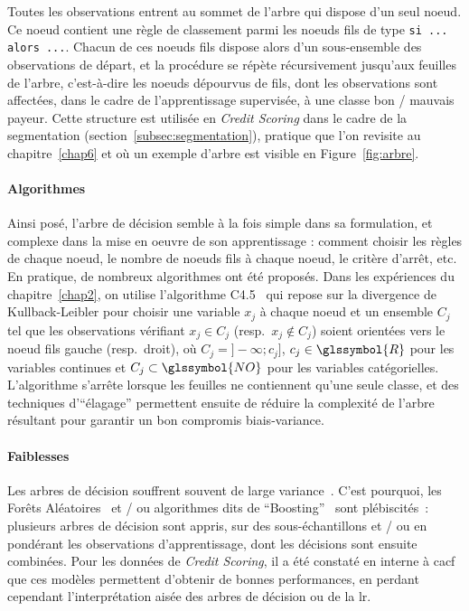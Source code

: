 Toutes les observations entrent au sommet de l'arbre qui dispose d'un seul noeud. Ce noeud contient une règle de classement parmi les noeuds fils de type \verb|si ... alors ...|. Chacun de ces noeuds fils dispose alors d'un sous-ensemble des observations de départ, et la procédure se répète récursivement jusqu'aux feuilles de l'arbre, c'est-à-dire les noeuds dépourvus de fils, dont les observations sont affectées, dans le cadre de l'apprentissage supervisée, à une classe bon / mauvais payeur. Cette structure est utilisée en \textit{Credit Scoring} dans le cadre de la segmentation (section~\ref{subsec:segmentation}), pratique que l'on revisite au chapitre~\ref{chap6} et où un exemple d'arbre est visible en Figure~\ref{fig:arbre}.

\paragraph{Algorithmes}

Ainsi posé, l'arbre de décision semble à la fois simple dans sa formulation, et complexe dans la mise en oeuvre de son apprentissage : comment choisir les règles de chaque noeud, le nombre de noeuds fils à chaque noeud, le critère d'arrêt, etc. En pratique, de nombreux algorithmes ont été proposés. Dans les expériences du chapitre~\ref{chap2}, on utilise l'algorithme C4.5~\cite{quinlan2014c4} qui repose sur la divergence de Kullback-Leibler pour choisir une variable $x_j$ à chaque noeud et un ensemble $C_j$ tel que les observations vérifiant $x_j \in C_j$ (resp.\ $x_j \not\in C_j$) soient orientées vers le noeud fils gauche (resp.\ droit), où $C_j = ]- \infty ; c_j]$, $c_j \in \glssymbol{R}$ pour les variables continues et $C_j \subset \glssymbol{NO}$ pour les variables catégorielles. L'algorithme s'arrête lorsque les feuilles ne contiennent qu'une seule classe, et des techniques d'``élagage'' permettent ensuite de réduire la complexité de l'arbre résultant pour garantir un bon compromis biais-variance.

\paragraph{Faiblesses}

Les arbres de décision souffrent souvent de large variance~\cite{geurts2000investigation}. C'est pourquoi, les Forêts Aléatoires~\cite{breiman2001random} et / ou algorithmes dits de ``Boosting''~\cite{zhou2012ensemble} sont plébiscités~: plusieurs arbres de décision sont appris, sur des sous-échantillons et / ou en pondérant les observations d'apprentissage, dont les décisions sont ensuite combinées. Pour les données de \textit{Credit Scoring}, il a été constaté en interne à \gls{cacf} que ces modèles permettent d'obtenir de bonnes performances, en perdant cependant l'interprétation aisée des arbres de décision ou de la \gls{lr}.

